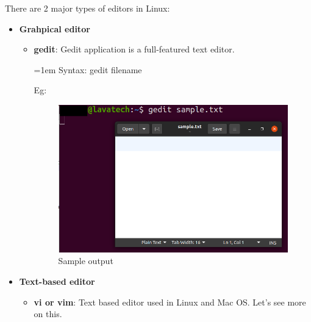 \setlength{\columnsep}{3pt}
\begin{flushleft}
	\bigskip
	There are 2 major types of editors in Linux:
	\begin{itemize}
		\item \textbf{Grahpical editor}
		\begin{itemize}
			\item \textbf{gedit}: 	Gedit application is a full-featured text editor.
			\begin{tcolorbox}[breakable,notitle,boxrule=0pt,colback=pink,colframe=pink]
				\color{black}
				\font=1em
				Syntax: gedit filename
				\font=4pt
			\end{tcolorbox}
			Eg:
			\begin{figure}[h!]
				\centering
				\includegraphics[scale=0.4]{content/chapter3/images/gedit.png}
				\caption{Sample output}
				\label{fig:cal32}
			\end{figure}
			
		\end{itemize}
		\item \textbf{Text-based editor}
		\begin{itemize}
			\item \textbf{vi or vim}:  Text based editor used in Linux and Mac OS. Let's see more on this.
		\end{itemize}
	\end{itemize}
\end{flushleft}

\newpage





